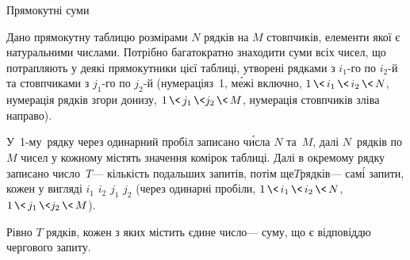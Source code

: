 \begin{problemAllDefault}{Прямокутні суми}

Дано прямокутну таблицю розмірами $N$ рядків на $M$ стовпчиків, елементи якої є натуральними числами. Потрібно багатократно знаходити суми всіх чисел, що потрапляють у деякі прямокутники цієї таблиці, утворені рядками з \mbox{$i_1$-го} по \mbox{$i_2$-й} та стовпчиками з \mbox{$j_1$-го} по \mbox{$j_2$-й} (нумерація\nolinebreak[2] з~1, м\'{е}жі включно, ${1\,{\<}\,i_1\,{\<}\,i_2\,{\<}\,N}$, нумерація рядків згори донизу, ${1\,{\<}\,j_1\,{\<}j_2\,{\<}\,M}$, нумерація стовпчиків зліва направо).

\InputFile  
У~\mbox{1-му}~рядку через одинарний пробіл записано ч\'{и}сла $N$ та~$M$, далі $N$~рядків по $M$ чисел у кожному містять значення комірок таблиці. 
Далі в окремому рядку записано число~$T$\nolinebreak[3] --- кількість подальших запитів, потім ще\nolinebreak[3] $T$\nolinebreak[3] рядків\nolinebreak[3] --- сам\'{і} запити, кожен у вигляді ${i_1\,\,i_2\,\,j_1\,\,j_2}$ (через одинарні пробіли, ${1\,{\<}\,i_1\,{\<}\,i_2\,{\<}\,N}$,\hspace{0.125em plus 1em} ${1\,{\<}\,j_1\,{\<}j_2\,{\<}\,M}$).

\OutputFile 
Рівно $T$ рядків, кожен з яких містить єдине число\nolinebreak[3] --- суму, що є відповіддю чергового запиту.


\Example


\end{problemAllDefault}
